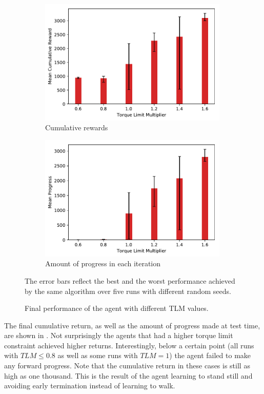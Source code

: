 \begin{figure}
    \centering
    \begin{subfigure}[t]{\textwidth}
        \centering
        \includegraphics[width=90mm]{img/TorqueLimit_Reward.pdf}
        \caption{Cumulative rewards}
    \end{subfigure}
    \begin{subfigure}[t]{\textwidth}
        \centering
        \includegraphics[width=90mm]{img/TorqueLimit_Progress.pdf}
        \caption{Amount of progress in each iteration}
        \label{fig:torque_limit_base_b}
    \end{subfigure}
    \caption{Final performance of the agent with different \ac{TLM} values.}{The error bars reflect the best and the worst performance achieved by the same algorithm over five runs with different random seeds.}
    \label{fig:torque_limit_base}
\end{figure}

The final cumulative return, as well as the amount of progress made at test time, are shown in . Not surprisingly the agents that had a higher torque limit constraint achieved higher returns. Interestingly, below a certain point (all runs with $TLM \leq 0.8$ as well as some runs with $TLM=1$) the agent failed to make any forward progress. Note that the cumulative return in these cases is still as high as one thousand. This is the result of the agent learning to stand still and avoiding early termination instead of learning to walk.


